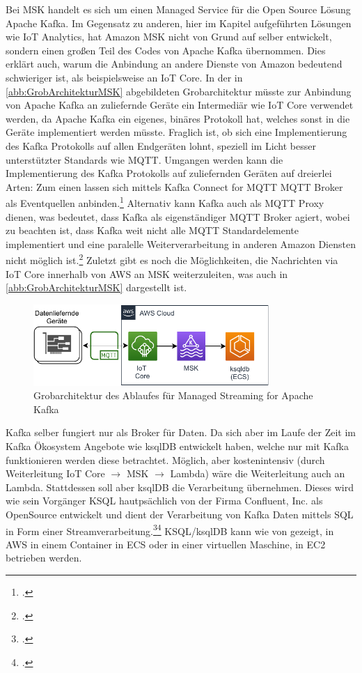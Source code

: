 Bei \ac{MSK} handelt es sich um einen Managed Service für die Open Source Lösung Apache Kafka. Im Gegensatz zu anderen, hier im Kapitel aufgeführten Lösungen wie \ac{IoT} Analytics, hat Amazon \ac{MSK} nicht von Grund auf selber entwickelt, sondern einen großen Teil des Codes von Apache Kafka übernommen. Dies erklärt auch, warum die Anbindung an andere Dienste von Amazon bedeutend schwieriger ist, als beispielsweise an \ac{IoT} Core. In der in \autoref{abb:GrobArchitekturMSK} abgebildeten Grobarchitektur müsste zur Anbindung von Apache Kafka an zuliefernde Geräte ein Intermediär wie \ac{IoT} Core verwendet werden, da Apache Kafka ein eigenes, binäres Protokoll hat, welches sonst in die Geräte implementiert werden müsste. Fraglich ist, ob sich eine Implementierung des Kafka Protokolls auf allen Endgeräten lohnt, speziell im Licht besser unterstützter Standards wie \ac{MQTT}. Umgangen werden kann die Implementierung des Kafka Protokolls auf zuliefernden Geräten auf dreierlei Arten: Zum einen lassen sich mittels Kafka Connect for \ac{MQTT} \ac{MQTT} Broker als Eventquellen anbinden.\footcite[Vgl.][]{Erber.12.01.2021} Alternativ kann Kafka auch als \ac{MQTT} Proxy dienen, was bedeutet, dass Kafka als eigenständiger MQTT Broker agiert, wobei zu beachten ist, dass Kafka weit nicht alle \ac{MQTT} Standardelemente implementiert und eine paralelle Weiterverarbeitung in anderen Amazon Diensten nicht möglich ist.\footcite[Vgl.][]{Erber.12.01.2021} Zuletzt gibt es noch die Möglichkeiten, die Nachrichten via \ac{IoT} Core innerhalb von \ac{AWS} an \ac{MSK} weiterzuleiten, was auch in \autoref{abb:GrobArchitekturMSK} dargestellt ist.
\begin{figure}[H]
\centering
\includegraphics[width=0.8\textwidth]{graphics/MSK-general.pdf}
\caption{Grobarchitektur des Ablaufes für Managed Streaming for Apache Kafka}
\label{abb:GrobArchitekturMSK}
\end{figure}

Kafka selber fungiert nur als Broker für Daten. Da sich aber im Laufe der Zeit im Kafka Ökosystem Angebote wie ksqlDB entwickelt haben, welche nur mit Kafka funktionieren werden diese betrachtet. Möglich, aber kostenintensiv (durch Weiterleitung \ac{IoT} Core  $\rightarrow$ MSK  $\rightarrow$ Lambda) wäre die Weiterleitung auch an Lambda. Stattdessen soll aber ksqlDB die Verarbeitung übernehmen. Dieses wird wie sein Vorgänger KSQL hautpsächlich von der Firma Confluent, Inc. als OpenSource entwickelt und dient der Verarbeitung von Kafka Daten mittels \ac{SQL} in Form einer Streamverarbeitung.\footcite[Vgl.][]{Kreps.2019}\nzitat\footcite[Vgl.][]{Narkhede.2017} KSQL/ksqlDB kann wie von \citeauthor{Penz.2020} gezeigt, in \ac{AWS} in einem Container in \ac{ECS} oder in einer virtuellen Maschine, in \ac{EC2} betrieben werden.


